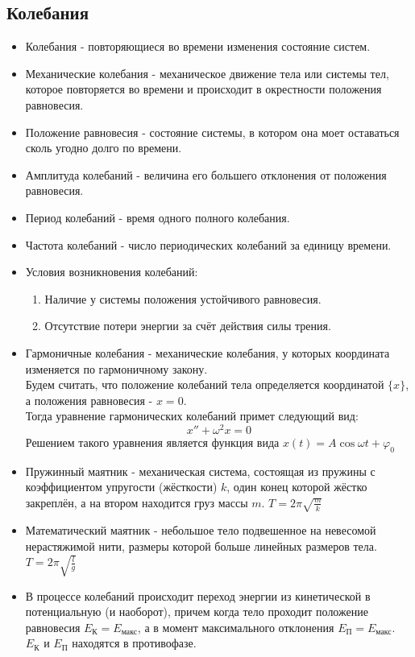 \documentclass{article}
\begin{document}
\begin{flushleft}
    \section{Колебания}
    \begin{itemize}
        \item Колебания - повторяющиеся во времени изменения состояние систем.
        \item Механические колебания - механическое движение тела или системы тел, которое повторяется во времени и происходит в окрестности положения равновесия.
        \item Положение равновесия - состояние системы, в котором она моет оставаться сколь угодно долго по времени.
        \item Амплитуда колебаний - величина его большего отклонения от положения равновесия.
        \item Период колебаний - время одного полного колебания.
        \item Частота колебаний - число периодических колебаний за единицу времени.
        \item Условия возникновения колебаний: 
            \begin{enumerate}
            \item Наличие у системы положения устойчивого равновесия.
            \item Отсутствие потери энергии за счёт действия силы трения.
        \end{enumerate}
        \item Гармоничные колебания - механические колебания, у которых координата изменяется по гармоничному закону.
        \\ Будем считать, что положение колебаний тела определяется координатой $\{x\}$, а положения равновесия - $x = 0$.
        \\ Тогда уравнение гармонических колебаний примет следующий вид: \[x'' + \omega^2 x = 0\] Решением такого уравнения является функция вида $x(t) = A\cos{\omega t + \varphi_0}$
        \item Пружинный маятник - механическая система, состоящая из пружины с коэффициентом упругости (жёсткости) $k$, один конец которой жёстко закреплён, а на втором находится груз массы $m$. $T = 2\pi \sqrt{\frac{m}{k}}$
        \item Математический маятник - небольшое тело подвешенное на невесомой нерастяжимой нити, размеры которой больше линейных размеров тела. $T = 2\pi \sqrt{\frac{l}{g}}$
        \item В процессе колебаний происходит переход энергии из кинетической в потенциальную (и наоборот), причем когда тело проходит положение равновесия $E_\text{К} = E_\text{макс}$, а в момент максимального отклонения $E_\text{П} = E_\text{макс}$. $E_\text{К}$ и $E_\text{П}$ находятся в противофазе.

\end{itemize}
\end{flushleft}
\end{document}
